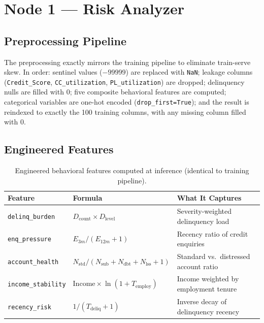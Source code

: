 \documentclass[11pt,a4paper]{article}
\begin{document}
\vspace{6pt}

\section{Node 1 --- Risk Analyzer}

\subsection{Preprocessing Pipeline}

The preprocessing exactly mirrors the training pipeline to eliminate train-serve skew. In order: sentinel values ($-99999$) are replaced with \texttt{NaN}; leakage columns (\texttt{Credit\_Score}, \texttt{CC\_utilization}, \texttt{PL\_utilization}) are dropped; delinquency nulls are filled with 0; five composite behavioral features are computed; categorical variables are one-hot encoded (\texttt{drop\_first=True}); and the result is reindexed to exactly the 100 training columns, with any missing column filled with 0.

\subsection{Engineered Features}

\begin{table}[h!]
    \centering
    \small
    \renewcommand{\arraystretch}{1.45}
    \begin{tabular}{@{} p{3.2cm} p{5.8cm} p{4.8cm} @{}}
        \toprule
        \textbf{Feature} & \textbf{Formula} & \textbf{What It Captures} \\
        \midrule
        \texttt{delinq\_burden}
            & $D_{\mathrm{count}} \times D_{\mathrm{level}}$
            & Severity-weighted delinquency load \\
        \texttt{enq\_pressure}
            & $E_{3m} / (E_{12m} + 1)$
            & Recency ratio of credit enquiries \\
        \texttt{account\_health}
            & $N_{\mathrm{std}} / (N_{\mathrm{sub}} + N_{\mathrm{dbt}} + N_{\mathrm{lss}} + 1)$
            & Standard vs.\ distressed account ratio \\
        \texttt{income\_stability}
            & $\mathrm{Income} \times \ln(1 + T_{\mathrm{employ}})$
            & Income weighted by employment tenure \\
        \texttt{recency\_risk}
            & $1 / (T_{\mathrm{deliq}} + 1)$
            & Inverse decay of delinquency recency \\
        \bottomrule
    \end{tabular}
    \caption{Engineered behavioral features computed at inference (identical to training pipeline).}
    \label{tab:features}
\end{table}
\end{document}

